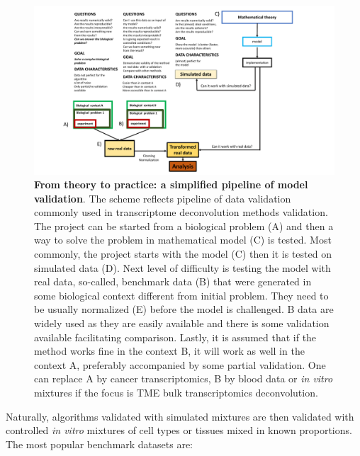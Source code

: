 \documentclass[12pt,]{book}
\theoremstyle{definition}
\theoremstyle{definition}
\theoremstyle{definition}
\theoremstyle{remark}
\begin{document}
\begin{figure}

{\centering \includegraphics[width=1\linewidth]{figures-ext/dataVal} 

}

\caption[From theory to practice: simplified pipeline of model validation]{\textbf{From theory to practice: a simplified
pipeline of model validation}. The scheme reflects pipeline of data
validation commonly used in transcriptome deconvolution methods
validation. The project can be started from a biological problem (A) and
then a way to solve the problem in mathematical model (C) is tested.
Most commonly, the project starts with the model (C) then it is tested
on simulated data (D). Next level of difficulty is testing the model
with real data, so-called, benchmark data (B) that were generated in
some biological context different from initial problem. They need to be
usually normalized (E) before the model is challenged. B data are widely
used as they are easily available and there is some validation available
facilitating comparison. Lastly, it is assumed that if the method works
fine in the context B, it will work as well in the context A, preferably
accompanied by some partial validation. One can replace A by cancer
transcriptomics, B by blood data or \emph{in vitro} mixtures if the
focus is TME bulk transcriptomics deconvolution.}\label{fig:dataVal}
\end{figure}


















Naturally, algorithms validated with simulated mixtures are then
validated with controlled \emph{in vitro} mixtures of cell types or
tissues mixed in known proportions. The most popular benchmark datasets
are:
\end{document}
